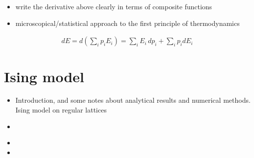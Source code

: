 \documentclass[letterpaper,10pt,english]{jupyterBook}
\begin{document}
\sphinxAtStartPar
{}
\begin{itemize}
\item {} 
\sphinxAtStartPar
write the derivative above clearly in terms of composite functions

\item {} 
\sphinxAtStartPar
microscopical/statistical approach to the first principle of thermodynamics

\end{itemize}
\begin{equation*}
\begin{split}d E = d \left( \sum_i p_i E_i \right) = \sum_i E_i \, d p_i + \sum_i p_i d E_i\end{split}
\end{equation*}
\sphinxstepscope


\chapter{Ising model}
\label{\detokenize{ch/statistical-mechanics/ising:ising-model}}\label{\detokenize{ch/statistical-mechanics/ising:statistical-mechanics-ising}}\label{\detokenize{ch/statistical-mechanics/ising::doc}}\begin{itemize}
\item {} 
\sphinxAtStartPar
Introduction, and some notes about analytical results and numerical methods. Ising model on regular lattices

\item {} 
\sphinxAtStartPar
{} 

\end{itemize}

\sphinxAtStartPar
{}
\begin{itemize}
\item {} 
\sphinxAtStartPar
{}

\item {} 
\sphinxAtStartPar
{}

\end{itemize}

\sphinxstepscope
\end{document}
